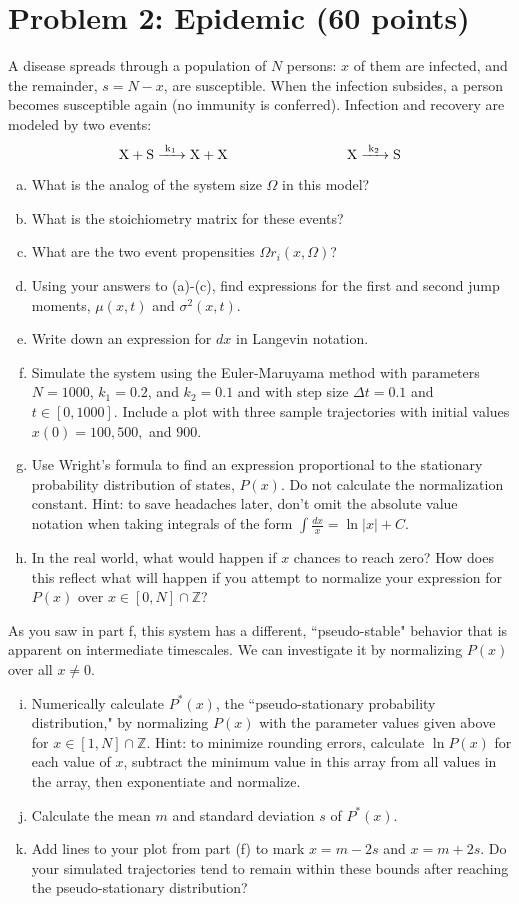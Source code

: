 \documentclass{article}
\begin{document}
\section*{Problem 2: Epidemic (60 points)}
A disease spreads through a population of $N$ persons: $x$ of them are infected, and the remainder, $s=N-x$, are susceptible. When the infection subsides, a person becomes susceptible again (no immunity is conferred). Infection and recovery are modeled by two events:
\[ \ce{X + S ->[k_1] X + X} \hspace{3 cm} \ce{X ->[k_2] S}  \]

\begin{enumerate}[a)]
\item What is the analog of the system size $\Omega$ in this model?
\item What is the stoichiometry matrix for these events?
\item What are the two event propensities $\Omega r_i(x, \Omega)$?
\item Using your answers to (a)-(c), find expressions for the first and second jump moments, $\mu(x,t)$ and $\sigma^2(x,t)$.
\item Write down an expression for $dx$ in Langevin notation.
\item Simulate the system using the Euler-Maruyama method with parameters $N=1000$, $k_1 = 0.2$, and $k_2 = 0.1$ and with step size $\Delta t = 0.1$ and $t \in [0,1000]$. Include a plot with three sample trajectories with initial values $x(0)=100,500,$ and $900$.
\item Use Wright's formula to find an expression proportional to the stationary probability distribution of states, $P(x)$. Do not calculate the normalization constant. Hint: to save headaches later, don't omit the absolute value notation when taking integrals of the form  $\int \frac{dx}{x} = \ln |x|+C$.
\item In the real world, what would happen if $x$ chances to reach zero? How does this reflect what will happen if you attempt to normalize your expression for $P(x)$ over $x \in [0, N] \cap \mathbb{Z}$?
\end{enumerate}
As you saw in part f, this system has a different, ``pseudo-stable" behavior that is apparent on intermediate timescales. We can investigate it by normalizing $P(x)$ over all $x \neq 0$.
\begin{enumerate}[a)]
\setcounter{enumi}{8}
\item Numerically calculate $P^*(x)$, the ``pseudo-stationary probability distribution," by normalizing $P(x)$ with the parameter values given above for $x \in [1, N] \cap \mathbb{Z}$.  Hint: to minimize rounding errors, calculate $\ln P(x)$ for each value of $x$, subtract the minimum value in this array from all values in the array, then exponentiate and normalize.
\item Calculate the mean $m$ and standard deviation $s$ of $P^*(x)$.
\item Add lines to your plot from part (f) to mark $x=m-2s$ and $x=m+2s$. Do your simulated trajectories tend to remain within these bounds after reaching the pseudo-stationary distribution?


\end{enumerate}
\end{document}
